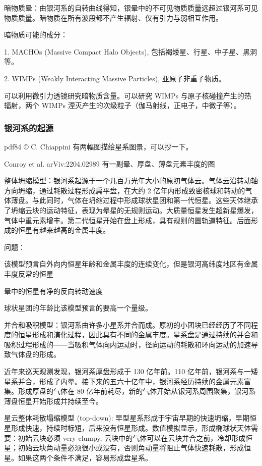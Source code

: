 \documentclass[../天体物理基础.tex]{subfiles}
\begin{document}
暗物质晕：由银河系的自转曲线得知，银晕中的不可见物质质量远超过银河系可见物质质量。暗物质在所有波段都不产生辐射、仅有引力与弱相互作用。

暗物质可能的成分：

1. MACHOs (Massive Compact Halo Objects), 包括褐矮星、行星、中子星、黑洞等。

2. WIMPs (Weakly Interacting Massive Particles), 亚原子非重子物质。

可以利用微引力透镜研究暗物质含量。可以研究 WIMPs 与原子核碰撞产生的热辐射，两个 WIMPs 湮灭产生的次级粒子（伽马射线，正电子，中微子等）。

\subsubsection{银河系的起源}

pdf84 © C. Chiappini 有两幅图描绘星系图景，可以抄一下。

Conroy et al. arViv:2204.02989 有一副晕、厚盘、薄盘元素丰度的图

整体坍缩模型：银河系起源于一个几百万光年大小的原初气体云。气体云沿转动轴方向坍缩，通过耗散过程形成扁平盘，在大约 2 亿年内形成致密核球和转动的气体薄盘。与此同时，气体在坍缩过程中形成球状星团和第一代恒星。这些天体继承了坍缩云块的运动特征，表现为晕星的无规则运动。大质量恒星发生超新星爆发，气体中重元素增丰。第二代恒星开始在盘上形成，具有规则的圆轨道特征。后面形成的恒星有越来越高的金属丰度。

问题：

该模型预言自外向内恒星年龄和金属丰度的连续变化，但是银河高纬度地区有金属丰度反常的恒星

晕中的恒星有净的反向转动速度

球状星团的年龄比该模型预言的要高一个量级。

并合和吸积模型：银河系由许多小星系并合而成。原初的小团块已经经历了不同程度的恒星形成和演化过程，因此具有不同的金属丰度。星系盘是通过持续的并合和吸积过程形成的——当吸积气体向内运动时，径向运动的耗散和环向运动的加速导致气体盘的形成。

近年来巡天观测发现，银河系厚盘形成于 130 亿年前。110 亿年前，银河系与一矮星系并合，形成了内晕。接下来的五六十亿年中，银河系经历持续的金属元素富集。形成厚盘的气体在 80 亿年前耗尽，新的气体开始从银河系周围聚集，银河系薄盘恒星开始形成并持续至今。

星云整体耗散塌缩模型 (top-down): 早型星系形成于宇宙早期的快速坍缩，早期恒星形成快速，持续时标短，后来没有恒星形成。数值模拟显示，形成椭球状天体需要：初始云块必须 very clumpy, 云块中的气体可以在云块并合之前，冷却形成恒星；初始云块角动量必须很小或没有，否则角动量将阻止气体快速耗散，形成恒星。如果这两个条件不满足，容易形成盘星系。
\end{document}
